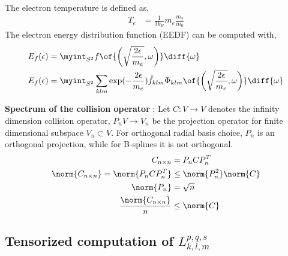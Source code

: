 The electron temperature is defined as, 
\begin{align*}
T_e & = \frac{1}{3k_B} m_e \frac{m_2}{m_0}
\end{align*}
The electron energy distribution function (EEDF) can be computed with, 
\begin{align*}
E_f(\epsilon) &= \myint_{S^2} f\of{\left(\sqrt{\frac{2\epsilon}{m_e}},\omega\right)} \diff{\omega} \\
E_f(\epsilon) &= \myint_{S^2} \sum_{klm} \exp(-\frac{2\epsilon}{m_e}) \hat{f}_{klm} \Phi_{klm}\of{\left(\sqrt{\frac{2\epsilon}{m_e}},\omega\right)} \diff{\omega}
\end{align*}


\textbf{Spectrum of the collision operator} : Let $C : V \rightarrow V$ denotes the infinity dimension collision operator, $P_n V \rightarrow V_n$ be the projection operator for finite dimensional subspace $V_n \subset V$. For orthogonal radial basis choice, $P_n$ is an orthogonal projection, while for B-splines it is not orthogonal.
\begin{align*}
C_{n\times n} &= P_n C P_n^T \\
\norm{C_{n\times n}} = \norm{P_n C P_n^T} &\leq \norm{P_n^2}\norm{C} \\
\norm{P_n} &=\sqrt{n} \\
\frac{\norm{C_{n\times n}}}{n} &\leq \norm{C}
\end{align*}

\subsection{Tensorized computation of ${L}_{k,l,m}^{p,q,s}$}

